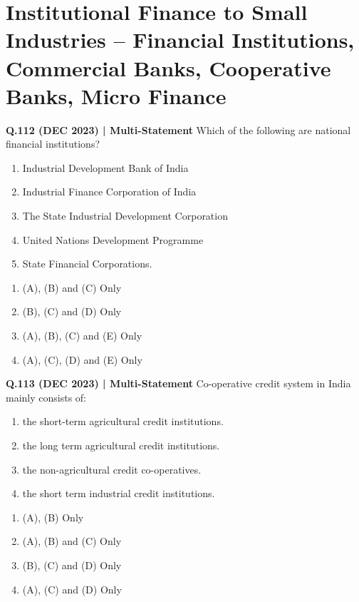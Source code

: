 \documentclass{article}
\begin{document}
\section{Institutional Finance to Small Industries – Financial Institutions, Commercial Banks, Cooperative Banks, Micro Finance}

\textbf{Q.112 (DEC 2023) | Multi-Statement}
Which of the following are national financial institutions?
\begin{enumerate}[label=\Alph*.]
    \item Industrial Development Bank of India
    \item Industrial Finance Corporation of India
    \item The State Industrial Development Corporation
    \item United Nations Development Programme
    \item State Financial Corporations.
\end{enumerate}
\begin{enumerate}[label=(\arabic*)]
    \item (A), (B) and (C) Only
    \item (B), (C) and (D) Only
    \item (A), (B), (C) and (E) Only
    \item (A), (C), (D) and (E) Only
\end{enumerate}

\textbf{Q.113 (DEC 2023) | Multi-Statement}
Co-operative credit system in India mainly consists of:
\begin{enumerate}[label=\Alph*.]
    \item the short-term agricultural credit institutions.
    \item the long term agricultural credit institutions.
    \item the non-agricultural credit co-operatives.
    \item the short term industrial credit institutions.
\end{enumerate}
\begin{enumerate}[label=(\arabic*)]
    \item (A), (B) Only
    \item (A), (B) and (C) Only
    \item (B), (C) and (D) Only
    \item (A), (C) and (D) Only
\end{enumerate}
\end{document}
